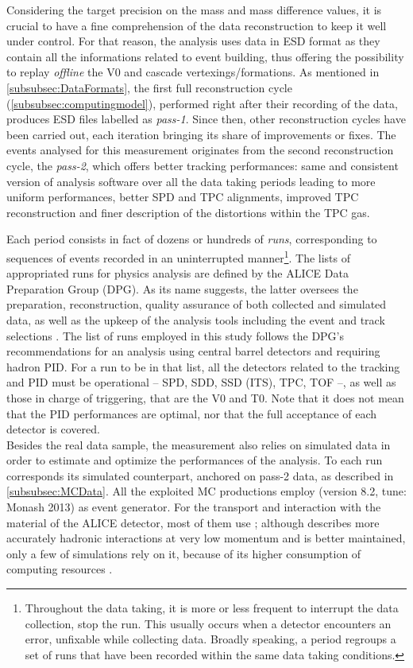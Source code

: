 Considering the target precision on the mass and mass difference values, it is crucial to have a fine comprehension of the data reconstruction to keep it well under control. For that reason, the analysis uses data in ESD format as they contain all the informations related to event building, thus offering the possibility to replay \textit{offline} the V0 and cascade vertexings/formations. As mentioned in \Sec\ref{subsubsec:DataFormats}, the first full reconstruction cycle (\Sec\ref{subsubsec:computingmodel}), performed right after their recording of the data, produces ESD files labelled as \textit{pass-1}. Since then, other reconstruction cycles have been carried out, each iteration bringing its share of improvements or fixes. The events analysed for this measurement originates from the second reconstruction cycle, the \emph{pass-2}, which offers better tracking performances: same and consistent version of analysis software over all the data taking periods leading to more uniform performances, better SPD and TPC alignments, improved TPC reconstruction and finer description of the distortions within the TPC gas.

Each period consists in fact of dozens or hundreds of \textit{runs}, corresponding to sequences of events recorded in an uninterrupted manner\footnote{Throughout the data taking, it is more or less frequent to interrupt the data collection, \ie stop the run. This usually occurs when a detector encounters an error, unfixable while collecting data. Broadly speaking, a period regroups a set of runs that have been recorded within the same data taking conditions.}. The lists of appropriated runs for physics analysis are defined by the ALICE Data Preparation Group (DPG). As its name suggests, the latter oversees the preparation, reconstruction, quality assurance of both collected and simulated data, as well as the upkeep of the analysis tools including the event and track selections \cite{alicecollaborationALICEDataPreparation2023}. The list of runs employed in this study follows the DPG's recommendations for an analysis using central barrel detectors and requiring hadron PID. For a run to be in that list, all the detectors related to the tracking and PID must be operational -- \ie SPD, SDD, SSD (ITS), TPC, TOF --, as well as those in charge of triggering, that are the V0 and T0. Note that it does not mean that the PID performances are optimal, nor that the full acceptance of each detector is covered.\\

Besides the real data sample, the measurement also relies on simulated data in order to estimate and optimize the performances of the analysis. To each run corresponds its simulated counterpart, anchored on pass-2 data, as described in \Sec\ref{subsubsec:MCData}. All the exploited MC productions employ \Pythiaeight (version 8.2, tune: Monash 2013) as event generator. For the transport and interaction with the material of the ALICE detector, most of them use \GeantThree; although \GeantFour describes more accurately hadronic interactions at very low momentum and is better maintained, only a few of simulations rely on it, because of its higher consumption of computing resources \cite{barendsGeant4ValidationStudy2017}. 

